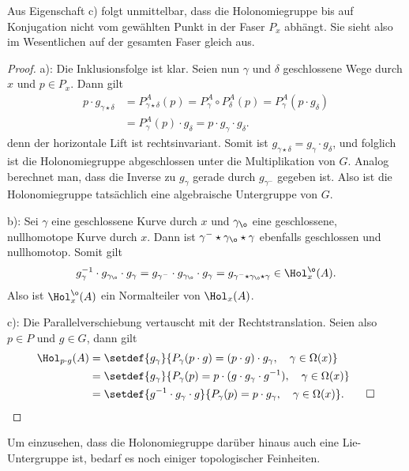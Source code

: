 \documentclass[%
	paper=a5,%
	fleqn,%
	DIV=18,%
	BCOR=0mm,
	fontsize=11pt,
	titlepage=false,%
	bibliography=totoc,
	DIV=18,%
	twoside=true,
	pdftitle=Riemannsche Geometrie,
	pdfauthor=Uwe Semmelmann,
	numbers=noendperiod]%
	{scrbook}
\begin{document}
Aus Eigenschaft c) folgt unmittelbar, dass die Holonomiegruppe bis auf Konjugation nicht vom gewählten Punkt in der Faser $P_{x}$ abhängt. Sie sieht also im Wesentlichen auf der gesamten Faser gleich aus.

\begin{proof}
a): Die Inklusionsfolge ist klar. Seien nun $\gamma$ und $\delta$ geschlossene Wege durch $x$ und $p\in P_{x}$. Dann gilt
\begin{align*}
p\cdot g_{\gamma\star\delta} &= P_{\gamma\star \delta}^{A}(p) = P_{\gamma}^{A}\circ P_{\delta}^{A}(p) = 
P_{\gamma}^A(p\cdot g_{\delta}) \\
 &= P_{\gamma}^A(p)\cdot g_{\delta} = p\cdot g_\gamma \cdot g_\delta.
\end{align*}
denn der horizontale Lift ist rechtsinvariant. Somit ist $g_{\gamma\star\delta} = g_{\gamma}\cdot g_{\delta}$, und folglich ist die Holonomiegruppe abgeschlossen unter die Multiplikation von $G$. Analog berechnet man, dass die Inverse zu $g_{\gamma}$ gerade durch $g_{\gamma^-}$ gegeben ist. Also ist die Holonomiegruppe tatsächlich eine algebraische Untergruppe von $G$.

b): Sei $\gamma$ eine geschlossene Kurve durch $x$ und $\gamma_{\o}$ eine geschlossene, nullhomotope Kurve durch $x$. Dann ist $\gamma^-\star\gamma_{\o}\star\gamma$ ebenfalls geschlossen und nullhomotop. Somit gilt
\begin{align*}
g_{\gamma}^{-1}\cdot g_{\gamma_{\o}}\cdot g_{\gamma} = 
g_{\gamma^-}\cdot g_{\gamma_{\o}}\cdot g_{\gamma} = 
g_{\gamma^-\star \gamma_{\o}\star \gamma} \in \Hol_{x}^{\o}(A).
\end{align*}
Also ist $\Hol_{x}^{\o}(A)$ ein Normalteiler von $\Hol_{x}(A)$.

c): Die Parallelverschiebung vertauscht mit der Rechtstranslation. Seien also $p\in P$ und $g\in G$, dann gilt
\begin{align*}
\Hol_{p\cdot g}(A) &= \setdef{g_{\gamma}}{P_{\gamma}(p\cdot g) = (p\cdot g)\cdot g_{\gamma},\quad \gamma\in \Omega(x)}\\
&= \setdef{g_{\gamma}}{P_{\gamma}(p) = p\cdot (g\cdot g_{\gamma}\cdot g^{-1}),\quad \gamma\in \Omega(x)}\\
&= \setdef{g^{-1}\cdot g_{\gamma}\cdot g}{P_{\gamma}(p) = p\cdot g_{\gamma},\quad \gamma\in \Omega(x)}.\qed
\end{align*}
\end{proof}

Um einzusehen, dass die Holonomiegruppe darüber hinaus auch eine Lie-Untergruppe ist, bedarf es noch einiger topologischer Feinheiten. 
\end{document}
